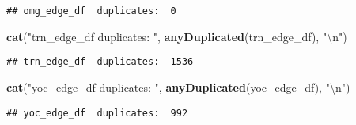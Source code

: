 \documentclass[]{article}
\newenvironment{Shaded}{\begin{snugshade}}{\end{snugshade}}
\newcommand{\KeywordTok}[1]{\textcolor[rgb]{0.13,0.29,0.53}{\textbf{#1}}}
\newcommand{\CharTok}[1]{\textcolor[rgb]{0.31,0.60,0.02}{#1}}
\newcommand{\StringTok}[1]{\textcolor[rgb]{0.31,0.60,0.02}{#1}}
\newcommand{\OperatorTok}[1]{\textcolor[rgb]{0.81,0.36,0.00}{\textbf{#1}}}
\newcommand{\NormalTok}[1]{#1}
\begin{document}
\begin{verbatim}
## omg_edge_df  duplicates:  0
\end{verbatim}

\begin{Shaded}
\begin{Highlighting}[]
\KeywordTok{cat}\NormalTok{(}\StringTok{"trn_edge_df  duplicates: "}\NormalTok{, }\KeywordTok{anyDuplicated}\NormalTok{(trn_edge_df),  }\StringTok{"}\CharTok{\textbackslash{}n}\StringTok{"}\NormalTok{)}
\end{Highlighting}
\end{Shaded}

\begin{verbatim}
## trn_edge_df  duplicates:  1536
\end{verbatim}

\begin{Shaded}
\begin{Highlighting}[]
\KeywordTok{cat}\NormalTok{(}\StringTok{"yoc_edge_df  duplicates: "}\NormalTok{, }\KeywordTok{anyDuplicated}\NormalTok{(yoc_edge_df),  }\StringTok{"}\CharTok{\textbackslash{}n}\StringTok{"}\NormalTok{)}
\end{Highlighting}
\end{Shaded}

\begin{verbatim}
## yoc_edge_df  duplicates:  992
\end{verbatim}

\begin{Shaded}
\end{Shaded}
\end{document}
